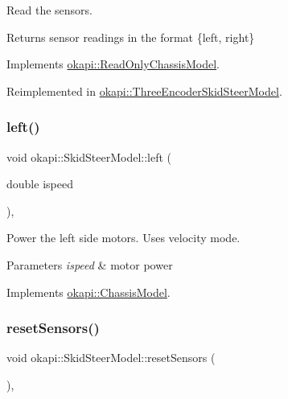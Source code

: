 Read the sensors.

\begin{DoxyReturn}{Returns}
sensor readings in the format \{left, right\} 
\end{DoxyReturn}


Implements \mbox{\hyperlink{classokapi_1_1ReadOnlyChassisModel_af2d844d9e12bb7c778ac9a5a0074f848}{okapi\+::\+Read\+Only\+Chassis\+Model}}.



Reimplemented in \mbox{\hyperlink{classokapi_1_1ThreeEncoderSkidSteerModel_a39af35aa25e5385584b3834911aed341}{okapi\+::\+Three\+Encoder\+Skid\+Steer\+Model}}.

\mbox{\label{classokapi_1_1SkidSteerModel_af2b00108853b82eb0fb5ecb3b71f413d}} 
\subsubsection{\texorpdfstring{left()}{left()}}
{\footnotesize\ttfamily void okapi\+::\+Skid\+Steer\+Model\+::left (\begin{DoxyParamCaption}\item[{double}]{ispeed }\end{DoxyParamCaption})\hspace{0.3cm}{\ttfamily [override]}, {\ttfamily [virtual]}}

Power the left side motors. Uses velocity mode.


\begin{DoxyParams}{Parameters}
{\em ispeed} & motor power \\
\hline
\end{DoxyParams}


Implements \mbox{\hyperlink{classokapi_1_1ChassisModel_aa2008856c169eb64c6648bc64c31c504}{okapi\+::\+Chassis\+Model}}.

\mbox{\label{classokapi_1_1SkidSteerModel_af8885fc16e654eafa872dd7c760591cf}} 
\subsubsection{\texorpdfstring{resetSensors()}{resetSensors()}}
{\footnotesize\ttfamily void okapi\+::\+Skid\+Steer\+Model\+::reset\+Sensors (\begin{DoxyParamCaption}{ }\end{DoxyParamCaption})\hspace{0.3cm}{\ttfamily [override]}, {\ttfamily [virtual]}}


